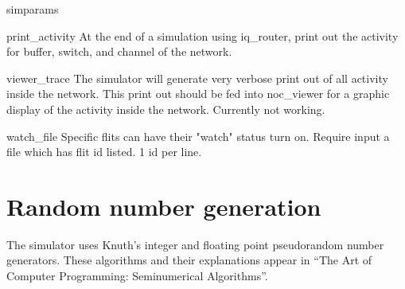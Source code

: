 \documentclass[11pt]{article}
\begin{document}
\begin{opt_list}{simparams}
\item[print\_activity] At the end of a simulation using iq\_router, print out the activity for buffer, switch, and channel of the network. 

\item[viewer\_trace] The simulator will generate very verbose print out of all activity inside the network. This print out should be fed into noc\_viewer for a graphic display of the activity inside the network. Currently not working. 

\item[watch\_file] Specific flits can have their "watch" status turn on. Require input a file which has flit id listed. 1 id per line. 

\end{opt_list}

\appendix

\section{Random number generation}

The simulator uses Knuth's integer and floating point pseudorandom
number generators.  These algorithms and their explanations appear in
``The Art of Computer Programming: Seminumerical Algorithms''.
\end{document}
